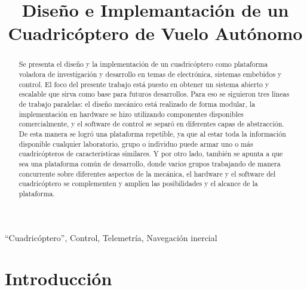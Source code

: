 \documentclass[a4paper, conference]{IEEEtran}
\begin{document}
%
\title{Diseño e Implemantación de un Cuadricóptero de Vuelo Autónomo}


\author{
}



\maketitle


\begin{abstract}
Se presenta el diseño y la implementación de un cuadricóptero como plataforma voladora de investigación y desarrollo en temas de electrónica, sistemas embebidos y control. El foco del presente trabajo está puesto en obtener un sistema abierto y escalable que sirva como base para futuros desarrollos.
Para eso se siguieron tres líneas de trabajo paralelas: el diseño mecánico está realizado de forma modular, la implementación en hardware se hizo utilizando componentes disponibles comercialmente, y el software de control se separó en diferentes capas de abstracción.
De esta manera se logró una plataforma repetible, ya que al estar toda la información disponible cualquier laboratorio, grupo o individuo puede armar uno o más cuadricópteros de características similares. Y por otro lado, también se apunta a que sea una plataforma común de desarrollo, donde varios grupos trabajando de manera concurrente sobre diferentes aspectos de la mecánica, el hardware y el software del cuadricóptero se complementen y amplíen las posibilidades y el alcance de la plataforma.
\end{abstract}


\begin{IEEEkeywords}
``Cuadricóptero'', Control, Telemetría, Navegación inercial
\end{IEEEkeywords}


\IEEEpeerreviewmaketitle



\section{Introducción}
\end{document}
